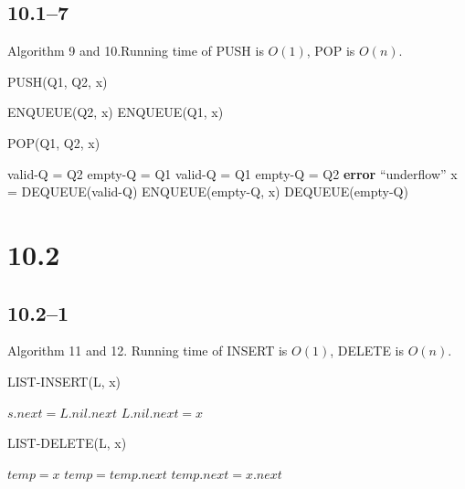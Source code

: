 \documentclass{article}
\begin{document}
\subsection*{10.1--7}
Algorithm 9 and 10.Running time of PUSH is $O(1)$, POP is $O(n)$.
\begin{algorithm}
  \caption{PUSH(Q1, Q2, x)}
  \begin{algorithmic}[1]
    \STATE ENQUEUE(Q2, x)
    \ELSE
    \STATE ENQUEUE(Q1, x)
    \ENDIF
  \end{algorithmic}
\end{algorithm}

\begin{algorithm}
  \caption{POP(Q1, Q2, x)}
  \begin{algorithmic}[1]
    \STATE valid-Q = Q2
    \STATE empty-Q = Q1
    \STATE valid-Q = Q1
    \STATE empty-Q = Q2
    \ELSE
    \STATE \textbf{error} ``underflow''
    \ENDIF
    \STATE x = DEQUEUE(valid-Q)
    \STATE ENQUEUE(empty-Q, x)
    \ENDWHILE
    \RETURN DEQUEUE(empty-Q)
  \end{algorithmic}
\end{algorithm}


\section*{10.2}
\subsection*{10.2--1}
Algorithm 11 and 12. Running time of INSERT is $O(1)$, DELETE is $O(n)$.
\begin{algorithm}
  \caption{LIST-INSERT(L, x)}
  \begin{algorithmic}[1]
    \STATE $s.next = L.nil.next$
    \STATE $L.nil.next = x$
  \end{algorithmic}
\end{algorithm}

\begin{algorithm}
  \caption{LIST-DELETE(L, x)}
  \begin{algorithmic}[1]
    \STATE $temp = x$
    \STATE $temp = temp.next$
    \ENDWHILE
    \STATE $temp.next = x.next$
  \end{algorithmic}
\end{algorithm}
\end{document}
